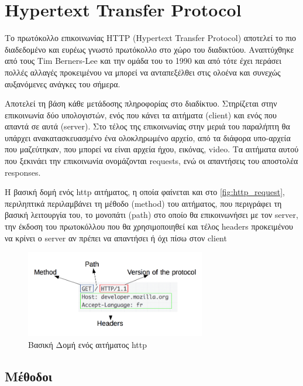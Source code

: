 \section{Hypertext Transfer Protocol}
\label{section:http}

Το πρωτόκολλο επικοινωνίας HTTP (Hypertext Transfer Protocol) αποτελεί το πιο διαδεδομένο και ευρέως γνωστό
πρωτόκολλο στο χώρο του διαδικτύου. Αναπτύχθηκε από τους Tim Berners-Lee και την ομάδα του το 1990 και από τότε
έχει περάσει πολλές αλλαγές προκειμένου να μπορεί να ανταπεξέλθει στις ολοένα και συνεχώς αυξανόμενες ανάγκες του σήμερα.

Αποτελεί τη βάση κάθε μετάδοσης πληροφορίας στο διαδίκτυο. Στηρίζεται στην επικοινωνία δύο υπολογιστών, ενός που κάνει τα αιτήματα (client)
και ενός που απαντά σε αυτά (server). Στο τέλος της επικοινωνίας στην μεριά του παραλήπτη θα υπάρχει ανακατασκευασμένο
ένα ολοκληρωμένο αρχείο, από τα διάφορα υπο-αρχεία που μαζεύτηκαν, που μπορεί να είναι αρχεία ήχου, εικόνας, video.
Τα αιτήματα αυτού που ξεκινάει την επικοινωνία ονομάζονται requests, ενώ οι απαντήσεις του αποστολέα responses.

Η βασική δομή ενός http αιτήματος, η οποία φαίνεται και στο \autoref{fig:http_request}, περιληπτικά περιλαμβάνει τη μέθοδο (method) του αιτήματος, που περιγράφει
τη βασική λειτουργία του, το μονοπάτι (path) στο οποίο θα επικοινωνήσει με τον server, την έκδοση του πρωτοκόλλου που 
θα χρησιμοποιηθεί και τέλος headers προκειμένου να κρίνει ο server αν πρέπει να απαντήσει ή όχι πίσω στον client

\begin{figure}[!ht]
	\centering
	\includegraphics[width=0.7\textwidth]{./images/chapter2/http_request.png}
	\caption[Βασική Δομή ενός αιτήματος http]{Βασική Δομή ενός αιτήματος http}
	\label{fig:http_request}
\end{figure}

\subsection{Μέθοδοι}
\label{subsec:http_methods}

